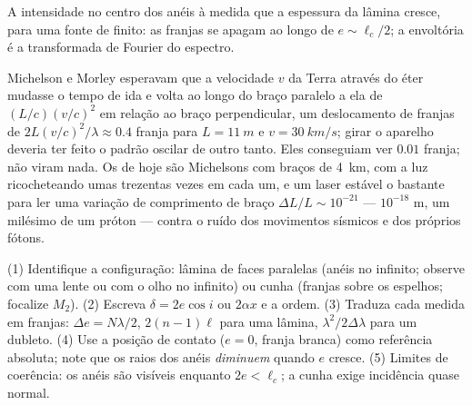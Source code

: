 \begin{omfigure}

{\small A intensidade no centro dos anéis à medida que a espessura da lâmina
cresce, para uma fonte de  finito: as franjas se apagam ao longo de
$e \sim \ell_c/2$; a envoltória é a transformada de Fourier do espectro.}
\end{omfigure}

\begin{remark}\label{rem:b2:michelson:history}
Michelson e Morley esperavam que a velocidade $v$ da Terra através do
éter mudasse o tempo de ida e volta ao longo do braço paralelo a ela de
$(L/c)(v/c)^2$ em relação ao braço perpendicular, um deslocamento de franjas de
$2L(v/c)^2/\lambda \approx 0.4$ franja para $L = \qty{11}{m}$ e $v = \qty{30}{km/s}$;
girar o aparelho deveria ter feito o padrão oscilar de outro tanto.
Eles conseguiam ver $0.01$ franja; não viram nada. Os  de hoje são Michelsons com braços de \qty{4}{km}, com a luz ricocheteando
umas trezentas vezes em cada um, e um laser estável o bastante para ler uma
variação de comprimento de braço $\Delta L/L \sim 10^{-21}$ --- $10^{-18}$ m, um milésimo
de um próton --- contra o ruído dos movimentos sísmicos e dos próprios
fótons.
\end{remark}

\begin{method}\label{met:b2:michelson:method}
(1) Identifique a configuração: lâmina de faces paralelas (anéis no infinito;
observe com uma lente ou com o olho no infinito) ou cunha (franjas sobre os
espelhos; focalize $M_2$). (2) Escreva $\delta = 2e\cos i$ ou $2\alpha x$ e a
ordem. (3) Traduza cada medida em franjas: $\Delta e = N\lambda/2$,
$2(n - 1)\ell$ para uma lâmina, $\lambda^2/2\Delta\lambda$ para um dubleto. (4) Use a
posição de contato ($e = 0$, franja branca) como referência absoluta;
note que os raios dos anéis \emph{diminuem} quando $e$ cresce. (5) Limites
de coerência: os anéis são visíveis enquanto $2e < \ell_c$; a cunha exige
incidência quase normal.
\end{method}

